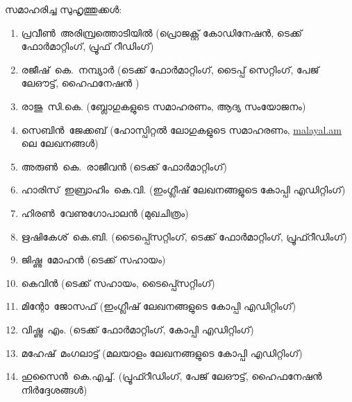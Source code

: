 ﻿
സമാഹരിച്ച സുഹൃത്തുക്കള്‍:

\begin{enumerate}
 \itemsep0em
 \item \mbox{പ്രവീണ്‍ അരിമ്പ്രത്തൊടിയില്‍} (പ്രൊജക്റ്റ് കോഡിനേഷന്‍, ടെക്ക് ഫോര്‍മാറ്റിംഗ്, പ്രൂഫ് റീഡിംഗ്)
 \item \mbox{രജീഷ് കെ. നമ്പ്യാര്‍} (ടെക്ക് ഫോര്‍മാറ്റിംഗ്, ടൈപ്പ് സെറ്റിംഗ്, പേജ് ലേഔട്ട്, ഹൈഫനേഷന്‍ )
 \item \mbox{രാജു സി.കെ.} (ബ്ലോഗുകളുടെ സമാഹരണം, ആദ്യ സംയോജനം)
 \item \mbox{സെബിന്‍ ജേക്കബ്} (ഹോസ്പിറ്റല്‍ ലോഗുകളുടെ സമാഹരണം, \url{malayal.am} ലെ ലേഖനങ്ങള്‍)
 \item \mbox{അരുണ്‍ കെ. രാജീവന്‍} (ടെക്ക് ഫോര്‍മാറ്റിംഗ്)
 \item \mbox{ഹാരിസ് ഇബ്രാഹിം  കെ.വി.} (ഇംഗ്ലീഷ് ലേഖനങ്ങളുടെ കോപ്പി എഡിറ്റിംഗ്)
 \item \mbox{ഹിരണ്‍ വേണുഗോപാലന്‍} (മുഖചിത്രം)
 \item \mbox{ഋഷികേശ് കെ.ബി.} (ടൈപ്പ്സെറ്റിംഗ്, ടെക്ക് ഫോര്‍മാറ്റിംഗ്, പ്രൂഫ്റീഡിംഗ്)
 \item \mbox{ജിഷ്ണു മോഹന്‍} (ടെക്ക് സഹായം)  
 \item \mbox{കെവിന്‍} (ടെക്ക് സഹായം, ടൈപ്പ്സെറ്റിംഗ്)
 \item \mbox{മിന്റോ ജോസഫ്} (ഇംഗ്ലീഷ് ലേഖനങ്ങളുടെ കോപ്പി എഡിറ്റിംഗ്)
 \item \mbox{വിഷ്ണു എം.} (ടെക്ക് ഫോര്‍മാറ്റിംഗ്, കോപ്പി എഡിറ്റിംഗ്)
 \item \mbox{മഹേഷ് മംഗലാട്ട്} (മലയാളം ലേഖനങ്ങളുടെ കോപ്പി എഡിറ്റിംഗ്)
 \item \mbox{ഹുസൈന്‍ കെ.എച്ച്.} (പ്രൂഫ്റീഡിംഗ്, പേജ് ലേഔട്ട്, ഹൈഫനേഷന്‍ നിര്‍ദ്ദേശങ്ങള്‍)
\end{enumerate}

\newpage

